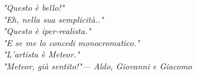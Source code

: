 \documentclass[twoside,openright,titlepage,
	headinclude,12pt,a4paper,BCOR=5mm,footinclude,bibliography=totoc,listof=totoc]{scrbook}
\begin{document}
\frenchspacing
\raggedbottom
{}
\pagestyle{plain}

\pagestyle{scrheadings}
\tableofcontents
\cleardoublepage
\thispagestyle{empty}
\begin{flushright}
	\null{}
	\emph{"Questo è bello!"\\
		"Eh, nella sua semplicità.."\\
		"Questo è iper-realista."\\
		"E se me lo concedi monocromatico."\\
		"L'artista è Meteor."\\
		"Meteor, già sentito!"\break --- Aldo, Giovanni e Giacomo} \null
\end{flushright}
\cleardoublepage






\nocite{*} %
\printbibliography

\end{document}
